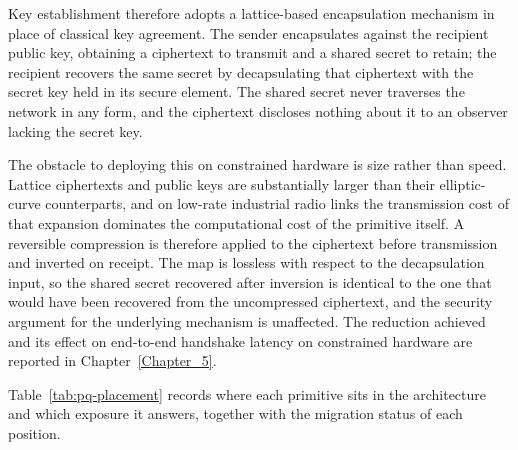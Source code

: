 Key establishment therefore adopts a lattice-based encapsulation mechanism in place of classical key agreement. The sender encapsulates against the recipient public key, obtaining a ciphertext to transmit and a shared secret to retain; the recipient recovers the same secret by decapsulating that ciphertext with the secret key held in its secure element. The shared secret never traverses the network in any form, and the ciphertext discloses nothing about it to an observer lacking the secret key.

The obstacle to deploying this on constrained hardware is size rather than speed. Lattice ciphertexts and public keys are substantially larger than their elliptic-curve counterparts, and on low-rate industrial radio links the transmission cost of that expansion dominates the computational cost of the primitive itself. A reversible compression is therefore applied to the ciphertext before transmission and inverted on receipt. The map is lossless with respect to the decapsulation input, so the shared secret recovered after inversion is identical to the one that would have been recovered from the uncompressed ciphertext, and the security argument for the underlying mechanism is unaffected. The reduction achieved and its effect on end-to-end handshake latency on constrained hardware are reported in Chapter~\ref{Chapter_5}.

Table~\ref{tab:pq-placement} records where each primitive sits in the architecture and which exposure it answers, together with the migration status of each position.

